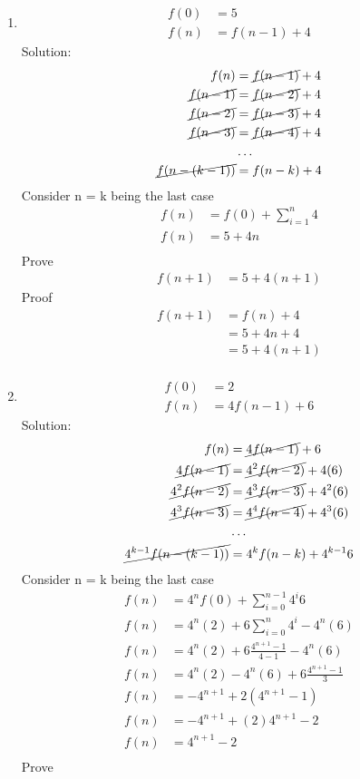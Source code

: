 \documentclass{article}
\begin{document}
\begin{enumerate}
\item
  \begin{align*}
    f(0) &= 5\\
    f(n) &= f(n-1) + 4
  \end{align*}
  Solution:
  \begin{align*}
    f(n) &= \cancel{f(n-1)}+4\\ 
    \cancel{f(n-1)} &= \cancel{f(n-2)} +4\\ 
    \cancel{f(n-2)} &= \cancel{f(n-3)} +4\\
    \cancel{f(n-3)} &= \cancel{f(n-4)} +4\\
    &\ldots\\
    \cancel{f(n-(k-1))} &= f(n-k)+4
  \end{align*}
  Consider n = k being the last case
  \begin{align*}
    f(n) &= f(0)+ \sum_{i=1}^{n}4 \\
    f(n) &= 5 + 4n \\
  \end{align*}
  Prove
  \begin{align*}
    f(n+1) &= 5 + 4(n + 1)
  \end{align*}
  Proof
  \begin{align*}
    f(n+1) &= f(n) + 4 \\
    &=  5 + 4n + 4 \\
    &=  5 + 4(n + 1)\\
  \end{align*}

\item
  \begin{align*}
    f(0) &= 2\\
    f(n) &= 4f(n-1) + 6
  \end{align*}
  Solution:
  \begin{align*}
    f(n) &= \cancel{4f(n-1)}+6\\ 
    \cancel{4f(n-1)} &= \cancel{4^2f(n-2)} +4(6)\\ 
    \cancel{4^2f(n-2)} &= \cancel{4^3f(n-3)} +4^2(6)\\ 
    \cancel{4^3f(n-3)} &= \cancel{4^4f(n-4)} +4^3(6)\\ 
    &\ldots\\
    \cancel{4^{k-1}f(n-(k-1))} &= 4^kf(n-k)+4^{k-1}6
  \end{align*}
  Consider n = k being the last case
  \begin{align*}
    f(n) &= 4^nf(0)+ \sum_{i=0}^{n-1}4^i6 \\
    f(n) &= 4^n(2)+ 6\sum_{i=0}^{n}4^i - 4^n(6) \\
    f(n) &= 4^n(2)+ 6\frac{4^{n+1} - 1}{4-1} - 4^n(6) \\
    f(n) &= 4^n(2) - 4^n(6) + 6\frac{4^{n+1} - 1}{3}  \\
    f(n) &= -4^{n + 1} + 2(4^{n+1} - 1)  \\
    f(n) &= -4^{n + 1} + (2)4^{n+1} - 2  \\
    f(n) &= 4^{n+1} - 2  \\
  \end{align*}
  Prove
  \begin{align*}
  \end{align*}



\end{enumerate}
\end{document}

